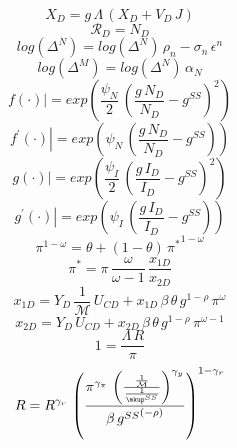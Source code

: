 \documentclass[10pt,a4paper]{article}
\begin{document}
\begin{dmath}
{X_D}={g}\, {\Lambda}\, \left({X_D}+{V_D}\, {J}\right)
\end{dmath}
\begin{dmath}
{\mathcal{R}_{D}}={N_D}
\end{dmath}
\begin{dmath}
log\left({\Delta^N}\right)=log\left({\Delta^N}\right)\, {\rho}_n-{\sigma}_n\, {\epsilon}^n
\end{dmath}
\begin{dmath}
log\left({\Delta^M}\right)=log\left({\Delta^N}\right)\, \alpha_N
\end{dmath}
\begin{dmath}
{\left.       f\left( \cdot \right)            \right|}=exp\left(\frac{{\psi_N}}{2}\, \left(\frac{{g}\, {N_D}}{{N_D}}-{g^{SS}}\right)^{2}\right)
\end{dmath}
\begin{dmath}
{\left.       f^{\prime}\left( \cdot \right)   \right|}=exp\left({\psi_N}\, \left(\frac{{g}\, {N_D}}{{N_D}}-{g^{SS}}\right)\right)
\end{dmath}
\begin{dmath}
{\left.       g\left( \cdot \right)            \right|}=exp\left(\frac{{\psi_I}}{2}\, \left(\frac{{g}\, {I_D}}{{I_D}}-{g^{SS}}\right)^{2}\right)
\end{dmath}
\begin{dmath}
{\left.       g^{\prime}\left( \cdot \right)   \right|}=exp\left({\psi_I}\, \left(\frac{{g}\, {I_D}}{{I_D}}-{g^{SS}}\right)\right)
\end{dmath}
\begin{dmath}
{\pi}^{1-{\omega}}={\theta}+\left(1-{\theta}\right)\, {\pi^*}^{1-{\omega}}
\end{dmath}
\begin{dmath}
{\pi^*}={\pi}\, \frac{{\omega}}{{\omega}-1}\, \frac{{x_{1D}}}{{x_{2D}}}
\end{dmath}
\begin{dmath}
{x_{1D}}={Y_D}\, \frac{1}{{\mathcal{M}}}\, {U_{CD}}+{x_{1D}}\, \beta\, {\theta}\, {g}^{1-\rho}\, {\pi}^{{\omega}}
\end{dmath}
\begin{dmath}
{x_{2D}}={Y_D}\, {U_{CD}}+{x_{2D}}\, \beta\, {\theta}\, {g}^{1-\rho}\, {\pi}^{{\omega}-1}
\end{dmath}
\begin{dmath}
1=\frac{{\Lambda}\, {R}}{{\pi}}
\end{dmath}
\begin{dmath}
{R}={R}^{{{\gamma}_{r}}}\, \left(\frac{{\pi}^{{{\gamma}_{\pi}}}\, \left(\frac{\frac{1}{{\mathcal{M}}}}{\frac{1}{{\mkup^{SS}}}}\right)^{{{\gamma}_{y}}}}{\beta\, {g^{SS}}^{\left(-\rho\right)}}\right)^{1-{{\gamma}_{r}}}
\end{dmath}
\end{document}
